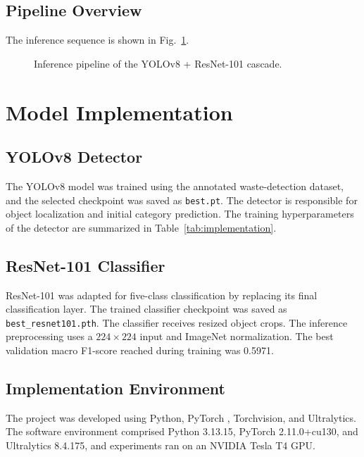 \documentclass[conference]{IEEEtran}
\begin{document}
\subsection{Pipeline Overview}
The inference sequence is shown in Fig.~\ref{fig:pipeline}.
\begin{figure}[htbp]
\centering
{}
\caption{Inference pipeline of the YOLOv8 + ResNet-101 cascade.}
\label{fig:pipeline}
\end{figure}

\section{Model Implementation}
\subsection{YOLOv8 Detector}
The YOLOv8 model was trained using the annotated waste-detection dataset, and the selected checkpoint was saved as \texttt{best.pt}. The detector is responsible for object localization and initial category prediction. The training hyperparameters of the detector are summarized in Table~\ref{tab:implementation}.

\subsection{ResNet-101 Classifier}
ResNet-101 was adapted for five-class classification by replacing its final classification layer. The trained classifier checkpoint was saved as \texttt{best\_resnet101.pth}. The classifier receives resized object crops. The inference preprocessing uses a $224\times224$ input and ImageNet normalization. The best validation macro F1-score reached during training was 0.5971.

\subsection{Implementation Environment}
The project was developed using Python, PyTorch \cite{paszke2019pytorch}, Torchvision, and Ultralytics. The software environment comprised Python 3.13.15, PyTorch 2.11.0+cu130, and Ultralytics 8.4.175, and experiments ran on an NVIDIA Tesla T4 GPU.
\end{document}
